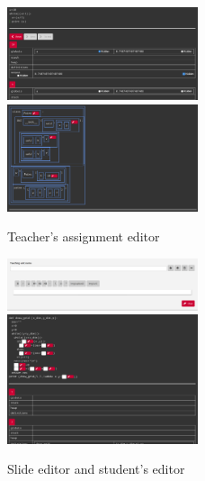 \begin{figure}
	\includegraphics[width=0.5\textwidth]{Figures/forward_assignment}
	\includegraphics[width=0.5\textwidth]{Figures/backward_assignment}
	\caption{Teacher's assignment editor}
	\label{fig:assignment_editor}
\end{figure}

\begin{figure}
	\includegraphics[width=0.5\textwidth]{Figures/slide_editor}
	\includegraphics[width=0.5\textwidth]{Figures/forward_assignment_student}
	\caption{Slide editor and student's editor}
	\label{fig:slide_editor_student_editor}
\end{figure}

